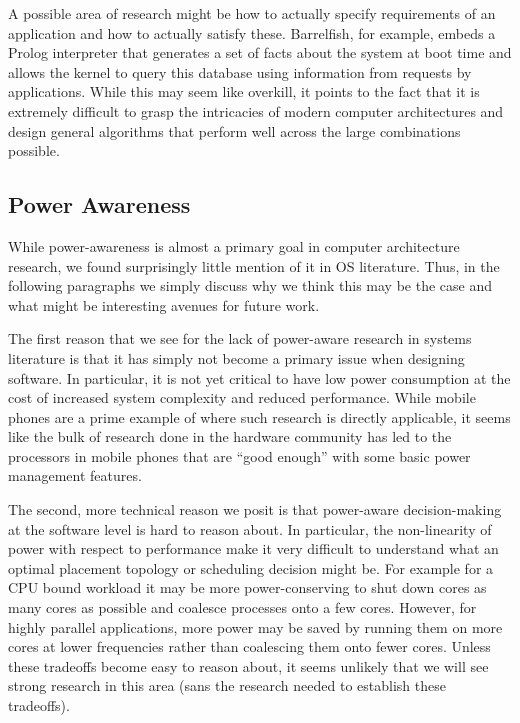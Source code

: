 A possible area of research might be how to actually specify requirements of an application and how to actually satisfy these. Barrelfish, for example, embeds a Prolog interpreter that generates a set of facts about the system at boot time and allows the kernel to query this database using information from requests by applications. While this may seem like overkill, it points to the fact that it is extremely difficult to grasp the intricacies of modern computer architectures and design general algorithms that perform well across the large combinations possible.

\subsection{Power Awareness}
While power-awareness is almost a primary goal in computer architecture research, we found surprisingly little mention of it in OS literature. Thus, in the following paragraphs we simply discuss why we think this may be the case and what might be interesting avenues for future work.

The first reason that we see for the lack of power-aware research in systems literature is that it has simply not become a primary issue when designing software. In particular, it is not yet critical to have low power consumption at the cost of increased system complexity and reduced performance. While mobile phones are a prime example of where such research is directly applicable, it seems like the bulk of research done in the hardware community has led to the processors in mobile phones that are ``good enough'' with some basic power management features.

The second, more technical reason we posit is that power-aware decision-making at the software level is hard to reason about. In particular, the non-linearity of power with respect to performance make it very difficult to understand what an optimal placement topology or scheduling decision might be. For example for a CPU bound workload it may be more power-conserving to shut down cores as many cores as possible and coalesce processes onto a few cores. However, for highly parallel applications, more power may be saved by running them on more cores at lower frequencies rather than coalescing them onto fewer cores. Unless these tradeoffs become easy to reason about, it seems unlikely that we will see strong research in this area (sans the research needed to establish these tradeoffs).